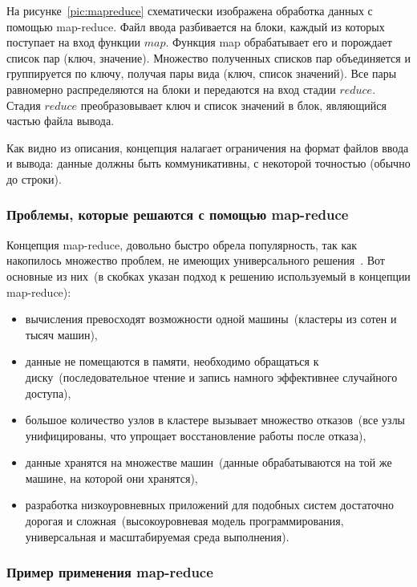 \documentclass[12pt,a4paper,oneside]{extarticle}
\begin{document}
        На рисунке~\ref{pic:mapreduce} схематически изображена обработка данных с помощью map-reduce. Файл ввода разбивается на блоки, каждый из которых поступает на вход функции $map$. Функция map обрабатывает его и порождает список пар (ключ, значение). Множество полученных списков пар объединяется и группируется по ключу, получая пары вида (ключ, список значений). Все пары равномерно распределяются на блоки и передаются на вход стадии $reduce$. Стадия $reduce$ преобразовывает ключ и список значений в блок, являющийся частью файла вывода.

        Как видно из описания, концепция налагает ограничения на формат файлов ввода и вывода: данные должны быть коммуникативны, с некоторой точностью (обычно до строки).

        \subsubsection{Проблемы, которые решаются с помощью map-reduce}
            Концепция map-reduce, довольно быстро обрела популярность, так как накопилось множество проблем, не имеющих универсального решения~\cite{problem}. Вот основные из них~(в скобках указан подход к решению используемый в концепции map-reduce):

            \begin{itemize}
                \item вычисления превосходят возможности одной машины~(кластеры из сотен и тысяч машин),
                \item данные не помещаются в памяти, необходимо обращаться к диску~(последовательное чтение и запись намного эффективнее случайного доступа),
                \item большое количество узлов в кластере вызывает множество отказов~(все узлы унифицированы, что упрощает восстановление работы после отказа),
                \item данные хранятся на множестве машин~(данные обрабатываются на той же машине, на которой они хранятся),
                \item разработка низкоуровневных приложений для подобных систем достаточно дорогая и сложная~(высокоуровневая модель программирования, универсальная и масштабируемая среда выполнения).
            \end{itemize} 

        \subsubsection{Пример применения map-reduce}
\end{document}
